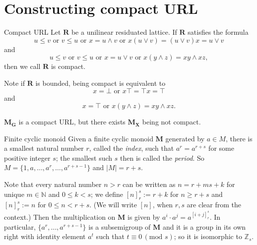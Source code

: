 \documentclass[professionalfont, 12pt]{beamer} %
\theoremstyle{plain}
\theoremstyle{definition}
\newcommand{\m}[1]{{\mathbf {#1} }}
\newcommand{\jn}{\vee}
\newcommand{\mt}{\wedge}
\begin{document}
\section{Constructing compact URL}

\begin{frame}{Compact URL}
    Let $\m R$ be a unilinear residuated lattice.
    If $\m R$ satisfies the formula
    \[
        u \leq v \text{ or } v \leq u \text{ or } x = u \mt v \text{ or } x(u \jn v) = (u \jn v)x = u \jn v
    \]
    and
    \[
        u \leq v \text{ or } v \leq u \text{ or } x = u \jn v \text{ or } x(y \mt z) = xy \mt xz,
    \]
    then we call $\m R$ is compact.

    Note if $\m R$ is bounded, being compact is equivalent to
    \[
        x = \bot \text{ or } x \top = \top x = \top
    \]
    and
    \[
        x = \top \text{ or } x (y \mt z) = xy \mt xz.
    \]

    $\m M_{\m G}$ is a compact URL, but there exists $\m {M_X}$ being not compact.
\end{frame}

\begin{frame}{Finite cyclic monoid}
    Given a finite cyclic monoid $\mathbf{M}$ generated by $a \in M$, there is a smallest natural number $r$, called the \emph{index}, such that $a^r = a^{r+s}$ for some  positive integer $s$; the smallest such $s$ then is called the \emph{period}.
    So $M = \{1, a, \dots, a^r, \dots, a^{r+s-1}\}$ and $|M|=r+s$.\pause
    
    Note that every natural number $n > r$ can be written as $n=r+ms+k$ for unique $m \in \mathbb{N}$ and $0 \leq k <s$; we define $[n]_r^s:= r+k$ for $n \geq r+s$ and $[n]_r^s:= n$ for $0 \leq n < r+s$.
    (We will write $[n]$, when $r,s$ are clear from the context.)
    Then the multiplication on $\m M$ is given by $a^i \cdot a^j =a^{[i+j]_r^s}$.
    In particular, $\{a^r, \dots, a^{r+s-1}\}$ is a subsemigroup of $\m M$ and it is a  group in its own right with identity element $a^t$ such that $t \equiv 0 \, (\text{mod } s)$; so it is isomorphic to $\mathbb{Z}_s$.
\end{frame}
\end{document}
